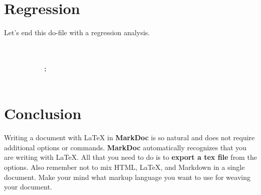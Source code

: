 \documentclass{article}
\begin{document}
\section{Regression}
Let's end this do-file with a regression analysis.

\begin{verbatim}
          
          
           : 
          

\end{verbatim}

\section{Conclusion}
Writing a document with \LaTeX{} in \textbf{MarkDoc} is so natural and
does not require additional options or commands. \textbf{MarkDoc}
automatically recognizes that you are writing with \LaTeX{}. All that
you need to do is to \textbf{export a tex file} from the options. Also
remember not to mix HTML, \LaTeX{}, and Markdown in a single document.
Make your mind what markup language you want to use for weaving your
document.


\end{document}
